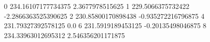 0 234.16107177734375 2.3677978515625
1 229.5066375732422 -2.2866363525390625
2 230.85800170898438 -0.935272216796875
4 231.79327392578125 0.0
6 231.5919189453125 -0.20135498046875
8 234.33963012695312 2.546356201171875
